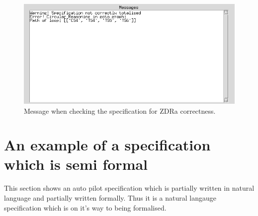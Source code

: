 \begin{figure}[H]
\includegraphics[scale=0.7]{examples/nonworkzdra/incorrect.png}
\caption{Message when checking the specification for ZDRa correctness.}
\end{figure}

\section{An example of a specification which is semi formal}
This section shows an auto pilot specification which is partially written in natural language and partially written formally. Thus it is a natural langauge specification which is on it's way to being formalised.

%
